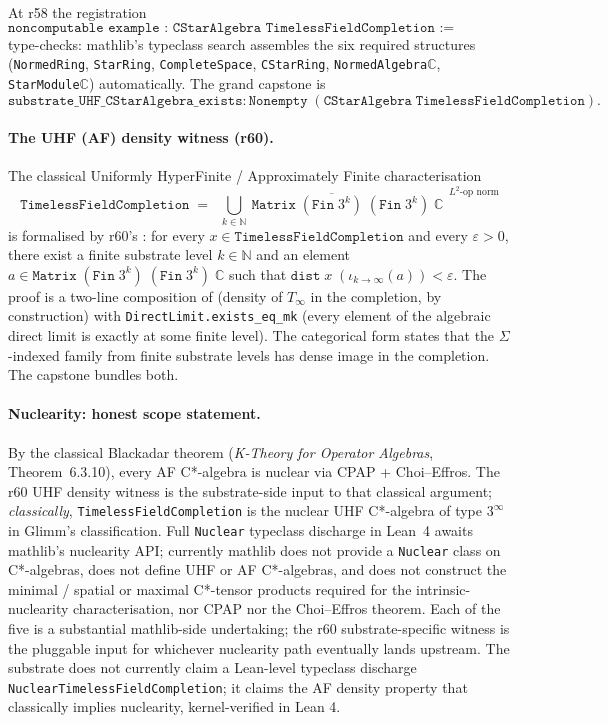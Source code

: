 \documentclass[11pt,a4paper]{amsart}
\theoremstyle{plain}
\theoremstyle{definition}
\begin{document}
At r58 the registration
\[
\texttt{noncomputable example : CStarAlgebra TimelessFieldCompletion := inferInstance}
\]
type-checks: mathlib's typeclass search assembles the six required structures (\texttt{NormedRing}, \texttt{StarRing}, \texttt{CompleteSpace}, \texttt{CStarRing}, \texttt{NormedAlgebra}\;$\mathbb{C}$, \texttt{StarModule}\;$\mathbb{C}$) automatically. The grand capstone is
\[
\texttt{substrate\_UHF\_CStarAlgebra\_exists} : \texttt{Nonempty}\;(\texttt{CStarAlgebra}\;\texttt{TimelessFieldCompletion}).
\]

\paragraph{The UHF (AF) density witness (r60).} The classical Uniformly HyperFinite / Approximately Finite characterisation
\[
\texttt{TimelessFieldCompletion} \;=\; \overline{\;\bigcup_{k \in \mathbb{N}}\ \texttt{Matrix}\;(\texttt{Fin}\;3^k)\;(\texttt{Fin}\;3^k)\;\mathbb{C}\;}^{\,L^2\text{-op norm}}
\]
is formalised by r60's : for every $x \in \texttt{TimelessFieldCompletion}$ and every $\varepsilon > 0$, there exist a finite substrate level $k \in \mathbb{N}$ and an element $a \in \texttt{Matrix}\;(\texttt{Fin}\;3^k)\;(\texttt{Fin}\;3^k)\;\mathbb{C}$ such that $\texttt{dist}\;x\;(\iota_{k \to \infty}(a)) < \varepsilon$. The proof is a two-line composition of  (density of $T_\infty$ in the completion, by construction) with \texttt{DirectLimit.exists\_eq\_mk} (every element of the algebraic direct limit is exactly at some finite level). The categorical form  states that the $\Sigma$-indexed family from finite substrate levels has dense image in the completion. The capstone  bundles both.

\paragraph{Nuclearity: honest scope statement.} By the classical Blackadar theorem (\emph{K-Theory for Operator Algebras}, Theorem~6.3.10), every AF C*-algebra is nuclear via CPAP + Choi--Effros. The r60 UHF density witness is the substrate-side input to that classical argument; \emph{classically}, \texttt{TimelessFieldCompletion} is the nuclear UHF C*-algebra of type $3^\infty$ in Glimm's classification. Full \texttt{Nuclear} typeclass discharge in Lean~4 awaits mathlib's nuclearity API; currently mathlib does not provide a \texttt{Nuclear} class on C*-algebras, does not define UHF or AF C*-algebras, and does not construct the minimal / spatial or maximal C*-tensor products required for the intrinsic-nuclearity characterisation, nor CPAP nor the Choi--Effros theorem. Each of the five is a substantial mathlib-side undertaking; the r60 substrate-specific witness is the pluggable input for whichever nuclearity path eventually lands upstream. The substrate does not currently claim a Lean-level typeclass discharge \texttt{Nuclear}\;\texttt{TimelessFieldCompletion}; it claims the AF density property that classically implies nuclearity, kernel-verified in Lean 4.
\end{document}

